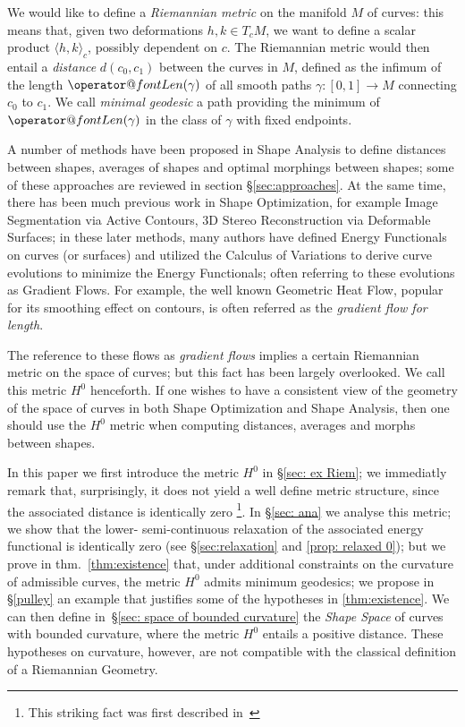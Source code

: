 \documentclass[twoside,a4paper,english]{article}
\makeatletter
\def\Len{\mathop{\operator@font Len}\nolimits}
\makeatother
\begin{document}
We would like to define a \emph{Riemannian metric}
on the manifold $M$ of curves: 
this means that, given two deformations $h,k\in T_cM$, we want to define
a scalar product $\langle h,k\rangle_c$, possibly dependent on $c$.
The Riemannian metric would then entail a \emph{distance} $d(c_0,c_1)$ between
the curves in $M$, defined as the infimum of the length $\Len(\gamma)$
of all smooth paths $\gamma:[0,1]\to M$ connecting $c_0$ to $c_1$.
We call \emph{minimal geodesic} a path providing the minimum of $\Len(\gamma)$
in the class of $\gamma$ with fixed endpoints.



\smallskip


A number of methods have been proposed in Shape Analysis to
define distances between shapes, averages of shapes and optimal
morphings between shapes;
some of these approaches are reviewed in section
\S\ref{sec:approaches}.  At the same time, there has been much
previous work in Shape Optimization, for example Image Segmentation
via Active Contours, 3D Stereo Reconstruction via Deformable Surfaces;
in these later methods, many authors have defined Energy Functionals
on curves (or surfaces) and utilized the Calculus of Variations to
derive curve evolutions to minimize the Energy Functionals; often
referring to these evolutions as Gradient Flows.  For example, the
well known Geometric Heat Flow, popular for its smoothing effect on
contours, is often referred as the \emph{gradient flow for length}.

The reference to these flows as \emph{gradient flows} implies a
certain Riemannian metric on the space of curves; but this fact has
been largely overlooked.  We call this metric $H^0$ henceforth. If one
wishes to have a consistent view of the geometry of the space of
curves in both Shape Optimization and Shape Analysis, then one should
use the $H^0$ metric when computing distances, averages and morphs
between shapes.

In this paper we first introduce the metric $H^0$ in \S\ref{sec: ex
  Riem}; we immediatly remark that, surprisingly, it
does not yield a well define metric structure, since the associated
distance is identically zero%
\footnote{This striking fact was first described
  in~\cite{Mumford:Gibbs}}.  In \S\ref{sec: ana} we analyse this
metric; we show that the lower-%
semi-continuous relaxation of the associated energy functional is
identically zero (see \S\ref{sec:relaxation} and \ref{prop: relaxed 0}); 
but we prove in thm.~\ref{thm:existence} that, under
additional constraints on the curvature of admissible curves, the
metric $H^0$ admits minimum geodesics; we propose in \S\ref{pulley} an
example that justifies some of the hypotheses in \ref{thm:existence}. We
can then define in~\S\ref{sec: space of bounded curvature} the
\emph{Shape Space} of curves with bounded curvature, where the metric
$H^0$ entails a positive distance. These hypotheses on curvature,
however, are not compatible with the classical definition of a
Riemannian Geometry.
\end{document}
